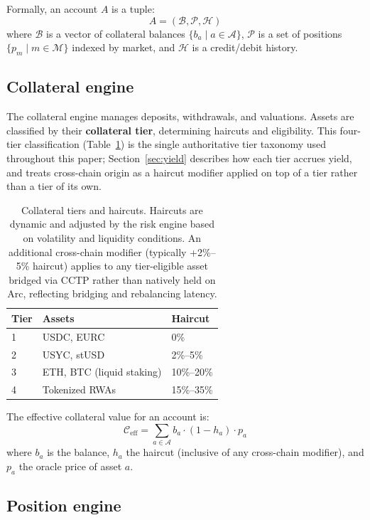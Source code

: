 \documentclass[11pt,a4paper]{article}
\begin{document}
Formally, an account $A$ is a tuple:
\[
A = (\mathcal{B}, \mathcal{P}, \mathcal{H})
\]
where $\mathcal{B}$ is a vector of collateral balances $\{b_a \mid a \in \mathcal{A}\}$, $\mathcal{P}$ is a set of positions $\{p_m \mid m \in \mathcal{M}\}$ indexed by market, and $\mathcal{H}$ is a credit/debit history.

\subsection{Collateral engine}

The collateral engine manages deposits, withdrawals, and valuations. Assets are classified by their \textbf{collateral tier}, determining haircuts and eligibility. This four-tier classification (Table~\ref{tab:collateral}) is the single authoritative tier taxonomy used throughout this paper; Section~\ref{sec:yield} describes how each tier accrues yield, and treats cross-chain origin as a haircut modifier applied on top of a tier rather than a tier of its own.

\begin{table}[h]
  \centering
  \begin{tabular}{lll}
    \toprule
    \textbf{Tier} & \textbf{Assets} & \textbf{Haircut} \\
    \midrule
    1 & USDC, EURC & 0\% \\
    2 & USYC, stUSD & 2\%--5\% \\
    3 & ETH, BTC (liquid staking) & 10\%--20\% \\
    4 & Tokenized RWAs & 15\%--35\% \\
    \bottomrule
  \end{tabular}
  \caption{Collateral tiers and haircuts. Haircuts are dynamic and adjusted by the risk engine based on volatility and liquidity conditions. An additional cross-chain modifier (typically +2\%--5\% haircut) applies to any tier-eligible asset bridged via CCTP rather than natively held on Arc, reflecting bridging and rebalancing latency.}
  \label{tab:collateral}
\end{table}

The effective collateral value for an account is:
\[
\mathcal{C}_{\text{eff}} = \sum_{a \in \mathcal{A}} b_a \cdot (1 - h_a) \cdot p_a
\]
where $b_a$ is the balance, $h_a$ the haircut (inclusive of any cross-chain modifier), and $p_a$ the oracle price of asset $a$.

\subsection{Position engine}
\end{document}
